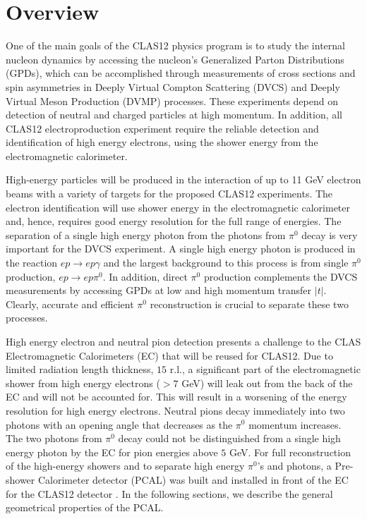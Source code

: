 \section{Overview}

One of the main goals of the CLAS12 physics program is to study the internal nucleon dynamics by accessing the nucleon's Generalized Parton Distributions (GPDs), which can be accomplished through measurements of cross sections and spin asymmetries in Deeply Virtual Compton Scattering (DVCS) and Deeply Virtual Meson Production (DVMP) processes. These experiments depend on detection of neutral and charged particles at high momentum. In addition, all CLAS12 electroproduction experiment require the reliable detection and identification of high energy electrons, using the shower energy from the electromagnetic calorimeter.

High-energy particles will be produced in the interaction of up to 11 GeV electron beams with a variety of targets for the proposed CLAS12 experiments. The electron identification will use shower energy in the electromagnetic calorimeter and, hence, requires good energy resolution for the full range of energies. The separation of a single high energy photon from the photons from $\pi^{0}$ decay is very important for the DVCS experiment. A single high energy photon is produced in the reaction $ep \to ep\gamma$ and the largest background to this process is from single $\pi^{0}$ production, $ep \to ep\pi^{0}$. In addition, direct $\pi^{0}$ production complements the DVCS measurements by accessing GPDs at low and high momentum transfer $|t|$. Clearly, accurate and efficient $\pi^{0}$ reconstruction is crucial to separate these two processes. 

High energy electron and neutral pion detection presents a challenge to the CLAS Electromagnetic Calorimeters (EC) that will be reused for CLAS12. Due to limited radiation length thickness, $15$ r.l., a significant part of the electromagnetic shower from high energy electrons ($>7$ GeV) will leak out from the back of the EC and will not be accounted for. This will result in a worsening of the energy resolution for high energy electrons. Neutral pions decay immediately into two photons with an opening angle that decreases as the $\pi^{0}$ momentum increases. The two photons from $\pi^{0}$ decay could not be distinguished from a single high energy photon by the EC for pion energies above $5$ GeV. For full reconstruction of the high-energy showers and to separate high energy $\pi^{0}$'s and photons, a Pre-shower Calorimeter detector (PCAL) was built and installed in front of the EC for the CLAS12 detector \cite{asryan}. In the following sections, we describe the general geometrical properties of the PCAL.



